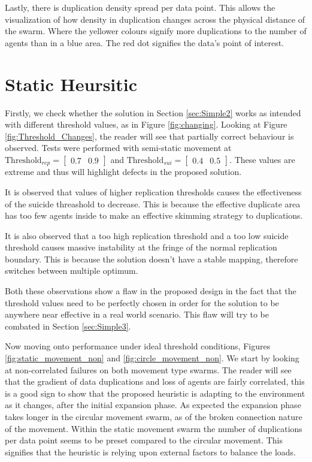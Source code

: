 \documentclass{UoYCSproject}
\begin{document}
Lastly, there is duplication density spread per data point. 
This allows the visualization of how density in duplication changes across the physical distance of the swarm. 
Where the yellower colours signify more duplications to the number of agents than in a blue area. 
The red dot signifies the data’s point of interest.


\section{Static Heursitic}
\label{sec:Simple2a}

Firstly, we check whether the solution in Section \ref{sec:Simple2} works as intended with different threshold values, as in Figure \ref{fig:changing}. 
Looking at Figure \ref{fig:Threshold_Changes}, the reader will see that partially correct behaviour is observed. 
Tests were performed with semi-static movement at $\text{Threshold}_{rep} = \begin{bmatrix} 0.7 & 0.9 \end{bmatrix}$ and $\text{Threshold}_{sui} = \begin{bmatrix} 0.4 & 0.5 \end{bmatrix}$. 
These values are extreme and thus will highlight defects in the proposed solution.

It is observed that values of higher replication thresholds causes the effectiveness of the suicide threashold to decrease. 
This is because the effective duplicate area has too few agents inside to make an effective skimming strategy to duplications. 

It is also observed that a too high replication threshold and a too low suicide threshold causes massive instability at the fringe of the normal replication boundary. 
This is because the solution doesn’t have a stable mapping, therefore switches between multiple optimum.

Both these observations show a flaw in the proposed design in the fact that the threshold values need to be perfectly chosen in order for the solution to be anywhere near effective in a real world scenario. 
This flaw will try to be combated in Section \ref{sec:Simple3}.

Now moving onto performance under ideal threshold conditions, Figures \ref{fig:static_movement_non} and \ref{fig:circle_movement_non}. 
We start by looking at non-correlated failures on both movement type swarms. 
The reader will see that the gradient of data duplications and loss of agents are fairly correlated, this is a good sign to show that the proposed heuristic is adapting to the environment as it changes, after the initial expansion phase. 
As expected the expansion phase takes longer in the circular movement swarm, as of the broken connection nature of the movement. 
Within the static movement swarm the number of duplications per data point seems to be preset compared to the circular movement. 
This signifies that the heuristic is relying upon external factors to balance the loads.
\end{document}
